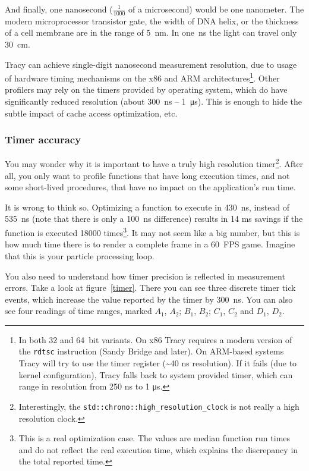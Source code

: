 \documentclass[hidelinks,titlepage,a4paper]{article}
\begin{document}
And finally, one nanosecond ($\frac{1}{1000}$ of a microsecond) would be one nanometer. The modern microprocessor transistor gate, the width of DNA helix, or the thickness of a cell membrane are in the range of 5~\si{\nano\metre}. In one~\si{\nano\second} the light can travel only 30~\si{\centi\meter}.

Tracy can achieve single-digit nanosecond measurement resolution, due to usage of hardware timing mechanisms on the x86 and ARM architectures\footnote{In both 32 and 64~bit variants. On x86 Tracy requires a modern version of the \texttt{rdtsc} instruction (Sandy Bridge and later). On ARM-based systems Tracy will try to use the timer register (\textasciitilde 40 \si{\nano\second} resolution). If it fails (due to kernel configuration), Tracy falls back to system provided timer, which can range in resolution from 250 \si{\nano\second} to 1 \si{\micro\second}.}. Other profilers may rely on the timers provided by operating system, which do have significantly reduced resolution (about 300~\si{\nano\second} -- 1~\si{\micro\second}). This is enough to hide the subtle impact of cache access optimization, etc.

\subsubsection{Timer accuracy}

You may wonder why it is important to have a truly high resolution timer\footnote{Interestingly, the \texttt{std::chrono::high\_resolution\_clock} is not really a high resolution clock.}. After all, you only want to profile functions that have long execution times, and not some short-lived procedures, that have no impact on the application's run time.

It is wrong to think so. Optimizing a function to execute in 430~\si{\nano\second}, instead of 535~\si{\nano\second} (note that there is only a 100~\si{\nano\second} difference) results in 14 \si{\milli\second} savings if the function is executed 18000 times\footnote{This is a real optimization case. The values are median function run times and do not reflect the real execution time, which explains the discrepancy in the total reported time.}. It may not seem like a big number, but this is how much time there is to render a complete frame in a 60~FPS game. Imagine that this is your particle processing loop.

You also need to understand how timer precision is reflected in measurement errors. Take a look at figure~\ref{timer}. There you can see three discrete timer tick events, which increase the value reported by the timer by 300~\si{\nano\second}. You can also see four readings of time ranges, marked $A_1$, $A_2$; $B_1$, $B_2$; $C_1$, $C_2$ and $D_1$, $D_2$.
\end{document}
